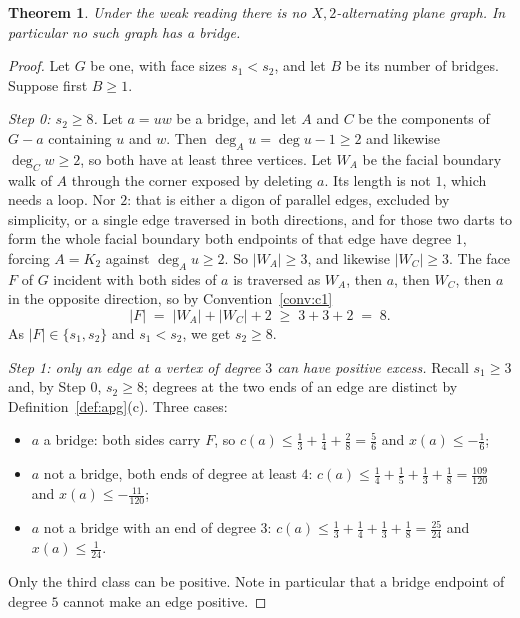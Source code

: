 \documentclass{baustms}
\theoremstyle{cupthm}
\newtheorem{theorem}{Theorem}[section]
\theoremstyle{cupdefn}
\theoremstyle{cuprem}
\begin{document}
\begin{theorem}\label{thm:nobridge}
Under the weak reading there is no $X,2$-alternating plane graph. In particular
no such graph has a bridge.
\end{theorem}

\begin{proof}
Let $G$ be one, with face sizes $s_1 < s_2$, and let $B$ be its number of
bridges. Suppose first $B \ge 1$.

\smallskip
\emph{Step 0: $s_2 \ge 8$.} Let $a = uw$ be a bridge, and let $A$ and $C$ be the
components of $G - a$ containing $u$ and $w$. Then $\deg_A u = \deg u - 1 \ge 2$
and likewise $\deg_C w \ge 2$, so both have at least three vertices. Let $W_A$
be the facial boundary walk of $A$ through the corner exposed by deleting $a$.
Its length is not $1$, which needs a loop. Nor $2$: that is either a digon of
parallel edges, excluded by simplicity, or a single edge traversed in both
directions, and for those two darts to form the whole facial boundary both
endpoints of that edge have degree $1$, forcing $A = K_2$ against
$\deg_A u \ge 2$. So $|W_A| \ge 3$, and likewise $|W_C| \ge 3$. The face $F$ of
$G$ incident with both sides of $a$ is traversed as $W_A$, then $a$, then $W_C$,
then $a$ in the opposite direction, so by Convention~\ref{conv:c1}
\[
  |F| \;=\; |W_A| + |W_C| + 2 \;\ge\; 3 + 3 + 2 \;=\; 8 .
\]
As $|F| \in \{s_1,s_2\}$ and $s_1 < s_2$, we get $s_2 \ge 8$.

\smallskip
\emph{Step 1: only an edge at a vertex of degree $3$ can have positive excess.}
Recall $s_1 \ge 3$ and, by Step 0, $s_2 \ge 8$; degrees at the two ends of an
edge are distinct by Definition~\ref{def:apg}(c). Three cases:
\begin{itemize}
  \item $a$ a bridge: both sides carry $F$, so
        $c(a) \le \tfrac13+\tfrac14+\tfrac28 = \tfrac56$ and
        $x(a) \le -\tfrac16$;
  \item $a$ not a bridge, both ends of degree at least $4$:
        $c(a) \le \tfrac14+\tfrac15+\tfrac13+\tfrac18 = \tfrac{109}{120}$ and
        $x(a) \le -\tfrac{11}{120}$;
  \item $a$ not a bridge with an end of degree $3$:
        $c(a) \le \tfrac13+\tfrac14+\tfrac13+\tfrac18 = \tfrac{25}{24}$ and
        $x(a) \le \tfrac1{24}$.
\end{itemize}
Only the third class can be positive. Note in particular that a bridge endpoint
of degree $5$ cannot make an edge positive.


\end{proof}
\end{document}
